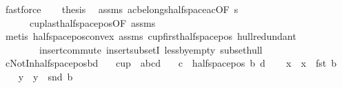 \begin{isabellebody}
\ fastforce\isanewline
\ \ \isamarkupfalse%
\ {\isacharquery}{\kern0pt}thesis\ \isamarkupfalse%
\ assms{\isacharparenleft}{\kern0pt}{}{\isacharparenright}{\kern0pt}\ a{\isacharunderscore}{\kern0pt}c{\isacharunderscore}{\kern0pt}belongs{\isacharunderscore}{\kern0pt}halfspace{\isacharunderscore}{\kern0pt}a{\isacharunderscore}{\kern0pt}c{\isacharbrackleft}{\kern0pt}OF\ s{\isacharunderscore}{\kern0pt}{}{\isacharbrackright}{\kern0pt}\ \ \isanewline
\ \ \ \ \ \ cup{}{\isacharunderscore}{\kern0pt}last{\isacharunderscore}{\kern0pt}halfspace{\isacharunderscore}{\kern0pt}pos{\isacharbrackleft}{\kern0pt}OF\ assms{\isacharparenleft}{\kern0pt}{}{\isacharparenright}{\kern0pt}{\isacharbrackright}{\kern0pt}\isanewline
\ \ \ \ \isamarkupfalse%
\ {\isacharparenleft}{\kern0pt}metis\ halfspace{\isacharunderscore}{\kern0pt}pos{\isacharunderscore}{\kern0pt}convex\ assms{\isacharparenleft}{\kern0pt}{}{\isacharparenright}{\kern0pt}\ cup{}{\isacharunderscore}{\kern0pt}first{\isacharunderscore}{\kern0pt}halfspace{\isacharunderscore}{\kern0pt}pos\ hull{\isacharunderscore}{\kern0pt}redundant\isanewline
\ \ \ \ \ \ \ \ insert{\isacharunderscore}{\kern0pt}commute\ insert{\isacharunderscore}{\kern0pt}subsetI\ less{\isacharunderscore}{\kern0pt}by{\isacharunderscore}{\kern0pt}empty\ subset{\isacharunderscore}{\kern0pt}hull{\isacharparenright}{\kern0pt}\isanewline
{}\isamarkupfalse%
%
\endisatagproof
{\isafoldproof}%
%
\isadelimproof
\isanewline
%
\endisadelimproof
\isanewline
{}\isamarkupfalse%
\ cNotInhalfspace{\isacharunderscore}{\kern0pt}pos{\isacharunderscore}{\kern0pt}bd{\isacharcolon}{\kern0pt}\isanewline
\ \ \ {\isachardoublequoteopen}cup\ {}\ {\isacharbrackleft}{\kern0pt}a{\isacharcomma}{\kern0pt}b{\isacharcomma}{\kern0pt}c{\isacharcomma}{\kern0pt}d{\isacharbrackright}{\kern0pt}{\isachardoublequoteclose}\isanewline
\ \ \ {\isachardoublequoteopen}c\ {\isasymnotin}\ halfspace{\isacharunderscore}{\kern0pt}pos\ b\ d{\isachardoublequoteclose}\isanewline
%
\isadelimproof
%
\endisadelimproof
%
\isatagproof
{}\isamarkupfalse%
{\isacharminus}{\kern0pt}\isanewline
\ \ \isamarkupfalse%
\ x{}\ \ {\isachardoublequoteopen}x{}\ {\isasymequiv}\ fst\ b{\isachardoublequoteclose}\isanewline
\ \ \isamarkupfalse%
\ y{}\ \ {\isachardoublequoteopen}y{}\ {\isasymequiv}\ snd\ b{\isachardoublequoteclose}\isanewline

\end{isabellebody}
